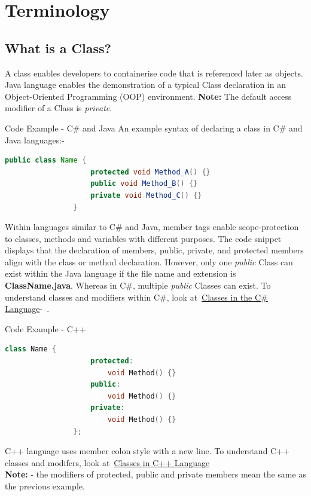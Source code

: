 \documentclass[10pt]{article}
\begin{document}
\section{Terminology}
\label{sec:terminology}
    \subsection{What is a Class?}
        A class enables developers to containerise code that is referenced later as objects. Java language enables the demonstration of a typical Class declaration in an Object-Oriented Programming (OOP) environment. \textbf{Note:} The default access modifier of a Class is \textit{private}.

        \begin{example}{Code Example - C\# and Java}
            An example syntax of declaring a class in C\# and Java languages:-
            \begin{lstlisting}[language=java]
                public class Name { 
                    protected void Method_A() {}
                    public void Method_B() {}
                    private void Method_C() {}
                }
            \end{lstlisting}

            Within languages similar to C\# and Java, member tags enable scope-protection to classes, methods and variables with different purposes. The code snippet displays that the declaration of members, public, private, and protected members align with the class or method declaration. However, only one \textit{public} Class can exist within the Java language if the file name and extension is \textbf{ClassName.java}. Whereas in C\#, multiple \textit{public} Classes can exist. To understand classes and modifiers within C\#, look at~\href{https://docs.microsoft.com/en-us/dotnet/csharp/fundamentals/types/classes}{Classes in the C\# Language}-~\cite{bill_wagner_classes_2021}. 
        \end{example} 

        \begin{example}{Code Example - C++}
            \begin{lstlisting}[language=c++]
                class Name { 
                    protected:
                        void Method() {}
                    public:
                        void Method() {}
                    private: 
                        void Method() {}
                };
            \end{lstlisting}
            C++ language uses member colon style with a new line. To understand C++ classes and modifers, look at~\href{https://www.cplusplus.com/doc/tutorial/classes/}{Classes in C++ Language}~\cite{cpluspluscom_classes_nodate}\\
            \textbf{Note:} - the modifiers of protected, public and private members mean the same as the previous example.
        \end{example}
\end{document}
